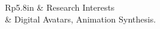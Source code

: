 \documentclass[letterpaper, 11pt]{article}
\newcommand{\headingfont}{\Large\color{OliveGreen}\vspace{-.4cm}}
\newenvironment{SectionTable}[1]{
	\renewcommand*{\arraystretch}{1.2}
	\setlength{\tabcolsep}{10pt} %
	\begin{longtable}{Rp{5.8in}} & #1 \\}
{\end{longtable}\vspace{-.4cm}}
\begin{document}





\begin{SectionTable}{\headingfont Research Interests}
	&
	Digital Avatars, Animation Synthesis.
	\end{SectionTable}

  


\end{document}
